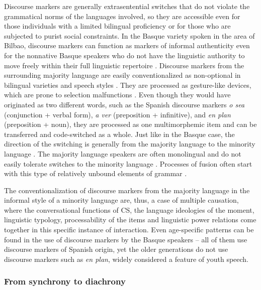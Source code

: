 \documentclass[output=paper,
modfonts
]{langscibook}
\begin{document}
Discourse markers are generally extrasentential switches that do not violate the grammatical norms of the languages involved, so they are accessible even for those individuals with a limited bilingual proficiency or for those who are subjected to purist social constraints. In the Basque variety spoken in the area of Bilbao, discourse markers can function as markers of informal authenticity even for the nonnative Basque speakers who do not have the linguistic authority to move freely within their full linguistic repertoire \parencite{lantto2018new}. Discourse markers from the surrounding majority language are easily conventionalized as non-optional in bilingual varieties and speech styles \parencite{goss2000evolution,matras2009language}. They are processed as gesture-like devices, which are prone to selection malfunctions \parencite{matras2009language}. Even though they would have originated as two different words, such as the Spanish discourse markers \textit{o sea} (conjunction + verbal form), \textit{a ver} (preposition + infinitive), and \textit{en plan} (preposition + noun), they are processed as one multimorphemic item and can be transferred and code-switched as a whole. Just like in the Basque case, the direction of the switching is generally from the majority language to the minority language \parencite{matras2009language}. The majority language speakers are often monolingual and do not easily tolerate switches to the minority language \parencite{matras2009language}. Processes of fusion often start with this type of relatively unbound elements of grammar \parencite{auer1999codeswitching}.

The conventionalization of discourse markers from the majority language in the informal style of a minority language are, thus, a case of multiple causation, where the conversational functions of CS, the language ideologies of the moment, linguistic typology, processability of the items and linguistic power relations come together in this specific instance of interaction. Even age-specific patterns can be found in the use of discourse markers by the Basque speakers – all of them use discourse markers of Spanish origin, yet the older generations do not use discourse markers such as \textit{en plan}, widely considered a feature of youth speech.

\subsubsection*{From synchrony to diachrony} 
\end{document}
